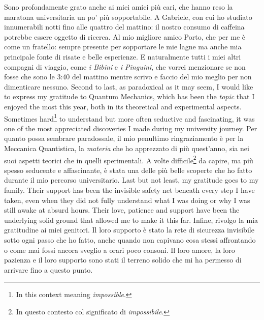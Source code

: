 \begin{paracol}{2}
    \switchcolumn
    Sono profondamente grato anche ai miei amici più cari, che hanno reso la maratona universitaria un po' più sopportabile. A Gabriele, con cui ho studiato innumerabili notti fino alle quattro del mattino: il nostro consumo di caffeina potrebbe essere oggetto di ricerca. Al mio migliore amico Porto, che per me è come un fratello: sempre presente per sopportare le mie lagne ma anche mia principale fonte di risate e belle esperienze. E naturalmente tutti i miei altri compagni di viaggio, come \emph{i Bibini} e \emph{i Pinguini}, che vorrei menzionare se non fosse che sono le 3:40 del mattino mentre scrivo e faccio del mio meglio per non dimenticare nessuno.
    \switchcolumn*
    Second to last, as paradoxical as it may seem, I would like to express my gratitude to Quantum Mechanics, which has been the \emph{topic} that I enjoyed the most this year, both in its theoretical and experimental aspects. Sometimes hard\footnote{In this context meaning \emph{impossible}.} to understand but more often seductive and fascinating, it was one of the most appreciated discoveries I made during my university journey.
    \switchcolumn
    Per quanto possa sembrare paradossale, il mio penultimo ringraziamento è per la Meccanica Quantistica, la \emph{materia} che ho apprezzato di più quest'anno, sia nei suoi aspetti teorici che in quelli sperimentali. A volte difficile\footnote{In questo contesto col significato di \emph{impossibile}.} da capire, ma più spesso seducente e affascinante, è stata una delle più belle scoperte che ho fatto durante il mio percorso universitario.
    \switchcolumn*
    Last but not least, my gratitude goes to my family. Their support has been the invisible safety net beneath every step I have taken, even when they did not fully understand what I was doing or why I was still awake at absurd hours. Their love, patience and support have been the underlying solid ground that allowed me to make it this far.
    \switchcolumn
    Infine, rivolgo la mia gratitudine ai miei genitori. Il loro supporto è stato la rete di sicurezza invisibile sotto ogni passo che ho fatto, anche quando non capivano cosa stessi affrontando o come mai fossi ancora sveglio a orari poco consoni. Il loro amore, la loro pazienza e il loro supporto sono stati il terreno solido che mi ha permesso di arrivare fino a questo punto.





\end{paracol}


